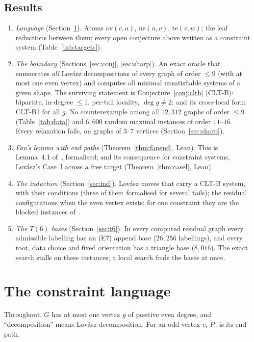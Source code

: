 \documentclass[11pt]{amsart}
\theoremstyle{definition}
\newcommand{\av}{\mathrm{av}}
\newcommand{\nev}{\mathrm{ne}}
\newcommand{\te}{\mathrm{te}}
\begin{document}
\subsection*{Results}
\begin{enumerate}[label=(\arabic*)]
\item \emph{Language} (Section~\ref{sec:lang}). Atoms $\av(c,a)$, $\nev(u,v)$, $\te(v,w)$; the
leaf reductions between them; every open conjecture above written as a constraint system
(Table~\ref{tab:targets}).
\item \emph{The boundary} (Sections~\ref{sec:conj}, \ref{sec:sharp}). An exact oracle that
enumerates \emph{all} Lov\'asz decompositions of every graph of order $\le9$ (with at most one even
vertex) and computes all minimal unsatisfiable systems of a given shape. The surviving statement is
Conjecture~\ref{conj:cltb} (CLT-B): bipartite, in-degree $\le1$, per-tail locality,
$\deg g\ne2$; and its cross-local form CLT-B1 for all $g$. No counterexample among all
$12{,}312$ graphs of order $\le 9$ (Table~\ref{tab:data}) and $6{,}600$ random maximal instances
of order $11$--$16$. Every relaxation fails, on graphs of $3$--$7$ vertices
(Section~\ref{sec:sharp}).
\item \emph{Fan's lemma with end paths} (Theorem~\ref{thm:fanend}, Lean). This is Lemma~4.1
of~\cite{T6}, formalised; and its consequence for constraint systems, Lov\'asz's Case~I across a
free target (Theorem~\ref{thm:caseI}, Lean).
\item \emph{The induction} (Section~\ref{sec:ind}). Lov\'asz moves that carry a CLT-B system, with
their conditions (three of them formalised for several tails); the residual configurations when the
even vertex exists; for one constraint they are the blocked instances of~\cite{L1S}.
\item \emph{The $T(6)$ bases} (Section~\ref{sec:t6}). In every computed residual graph every
admissible labelling has an (E7) append base ($26{,}256$ labellings), and every root, data choice
and fixed orientation has a triangle base ($8{,}016$). The exact search stalls on these instances; a
local search finds the bases at once.
\end{enumerate}

\section{The constraint language}\label{sec:lang}

Throughout, $G$ has at most one vertex $g$ of positive even degree, and ``decomposition'' means
Lov\'asz decomposition. For an odd vertex $v$, $P_v$ is its end path.
\end{document}
